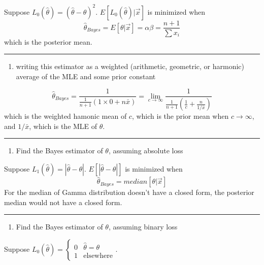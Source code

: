 \documentclass[12pt,]{article}
\providecommand{\tightlist}{%
  \setlength{\itemsep}{0pt}\setlength{\parskip}{0pt}}
\begin{document}
Suppose \(L_0(\hat\theta)=(\hat\theta-\theta)^2\).
\(E[L_0(\hat\theta)|\vec x]\) is minimized when
\[\hat\theta_{Bayes}=E[\theta|\vec x]=\alpha\beta=\frac{n+1}{\sum x_i}\]
which is the posterior mean.

\begin{center}\rule{0.5\linewidth}{\linethickness}\end{center}

\begin{enumerate}
\def\labelenumi{\alph{enumi}.}
\setcounter{enumi}{2}
\tightlist
\item
  \textcolor[rgb]{0.5,0.5,0.5}{writing this estimator as a weighted (arithmetic, geometric, or harmonic) average of the MLE and some prior constant}
\end{enumerate}

\[\hat\theta_{Bayes}=\frac1{\frac1{n+1}(1\times0+n\bar x)}=\lim_{c\to\infty}\frac1{\frac1{n+1}(\frac1{c}+\frac{n}{1/\bar x})}\]
which is the weighted hamonic mean of \(c\), which is the prior mean
when \(c\to\infty\), and \(1/\bar x\), which is the MLE of \(\theta\).

\begin{center}\rule{0.5\linewidth}{\linethickness}\end{center}

\begin{enumerate}
\def\labelenumi{\alph{enumi}.}
\setcounter{enumi}{3}
\tightlist
\item
  \textcolor[rgb]{0.5,0.5,0.5}{Find the Bayes estimator of $\theta$, assuming absolute loss}
\end{enumerate}

Suppose \(L_1(\hat\theta)=|\hat\theta-\theta|\).
\(E[|\hat\theta-\theta|]\) is minimized when
\[\hat\theta_{Bayes}=median[\theta|\vec x]\] For the median of Gamma
distribution doesn't have a closed form, the posterior median would not
have a closed form.

\begin{center}\rule{0.5\linewidth}{\linethickness}\end{center}

\begin{enumerate}
\def\labelenumi{\alph{enumi}.}
\setcounter{enumi}{4}
\tightlist
\item
  \textcolor[rgb]{0.5,0.5,0.5}{Find the Bayes estimator of $\theta$, assuming binary loss}
\end{enumerate}

Suppose
\(L_0(\hat\theta)=\begin{cases}0&\hat\theta=\theta\\1&\text{elsewhere}\end{cases}\).
\end{document}
